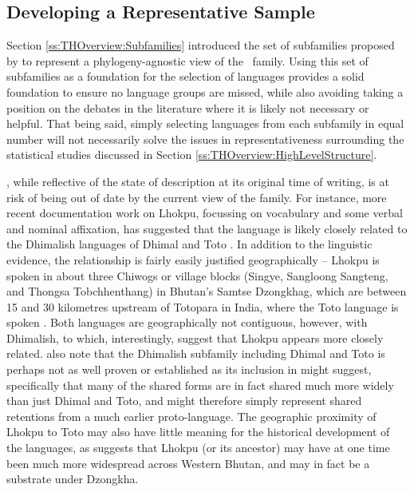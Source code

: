 \subsection{Developing a Representative Sample}\label{ss:Methods:RepSample}
Section \ref{ss:THOverview:Subfamilies} introduced the set of subfamilies proposed by  to represent a phylogeny-agnostic view of the \lfam\ family. Using this set of subfamilies as a foundation for the selection of languages provides a solid foundation to ensure no language groups are missed, while also avoiding taking a position on the debates in the literature where it is likely not necessary or helpful. That being said, simply selecting languages from each subfamily in equal number will not necessarily solve the issues in representativeness surrounding the statistical studies discussed in Section \ref{ss:THOverview:HighLevelStructure}.

, while reflective of the state of description at its original time of writing, is at risk of being out of date by the current view of the family. For instance, more recent documentation work on Lhokpu, focussing on vocabulary and some verbal and nominal affixation, has suggested that the language is likely closely related to the Dhimalish languages of Dhimal and Toto \cite{Grollmann2018}. In addition to the linguistic evidence, the relationship is fairly easily justified geographically -- Lhokpu is spoken in about three Chiwogs or village blocks (Singye, Sangloong Sangteng, and Thongsa Tobchhenthang) in Bhutan's Samtse Dzongkhag, which are between 15 and 30 kilometres upstream of Totopara in India, where the Toto language is spoken \cite{Basumatary2016}. Both languages are geographically not contiguous, however, with Dhimalish, to which, interestingly,  suggest that Lhokpu appears more closely related.  also note that the Dhimalish subfamily including Dhimal and Toto is perhaps not as well proven or established as its inclusion in  might suggest, specifically that many of the shared forms are in fact shared much more widely than just Dhimal and Toto, and might therefore simply represent shared retentions from a much earlier proto-language. The geographic proximity of Lhokpu to Toto may also have little meaning for the historical development of the languages, as  suggests that Lhokpu (or its ancestor) may have at one time been much more widespread across Western Bhutan, and may in fact be a substrate under Dzongkha.

